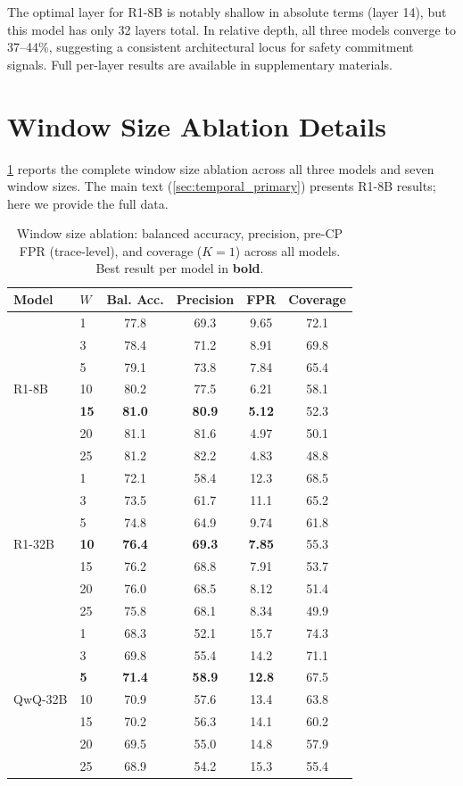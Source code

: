 The optimal layer for R1-8B is notably shallow in absolute terms (layer 14), but this model has only 32 layers total. In relative depth, all three models converge to 37--44\%, suggesting a consistent architectural locus for safety commitment signals. Full per-layer results are available in supplementary materials.


\section{Window Size Ablation Details}
\label{app:window_ablation}

\cref{tab:window_full} reports the complete window size ablation across all three models and seven window sizes. The main text (\cref{sec:temporal_primary}) presents R1-8B results; here we provide the full data.

\begin{table}[h]
\centering
\small
\caption{Window size ablation: balanced accuracy, precision, pre-CP FPR (trace-level), and coverage ($K{=}1$) across all models. Best result per model in \textbf{bold}.}
\label{tab:window_full}
\begin{tabular}{llcccc}
\toprule
Model & $W$ & Bal. Acc. & Precision & FPR & Coverage \\
\midrule
\multirow{7}{*}{R1-8B}
 & 1  & 77.8 & 69.3 & 9.65 & 72.1 \\
 & 3  & 78.4 & 71.2 & 8.91 & 69.8 \\
 & 5  & 79.1 & 73.8 & 7.84 & 65.4 \\
 & 10 & 80.2 & 77.5 & 6.21 & 58.1 \\
 & \textbf{15} & \textbf{81.0} & \textbf{80.9} & \textbf{5.12} & 52.3 \\
 & 20 & 81.1 & 81.6 & 4.97 & 50.1 \\
 & 25 & 81.2 & 82.2 & 4.83 & 48.8 \\
\midrule
\multirow{7}{*}{R1-32B}
 & 1  & 72.1 & 58.4 & 12.3 & 68.5 \\
 & 3  & 73.5 & 61.7 & 11.1 & 65.2 \\
 & 5  & 74.8 & 64.9 & 9.74 & 61.8 \\
 & \textbf{10} & \textbf{76.4} & \textbf{69.3} & \textbf{7.85} & 55.3 \\
 & 15 & 76.2 & 68.8 & 7.91 & 53.7 \\
 & 20 & 76.0 & 68.5 & 8.12 & 51.4 \\
 & 25 & 75.8 & 68.1 & 8.34 & 49.9 \\
\midrule
\multirow{7}{*}{QwQ-32B}
 & 1  & 68.3 & 52.1 & 15.7 & 74.3 \\
 & 3  & 69.8 & 55.4 & 14.2 & 71.1 \\
 & \textbf{5}  & \textbf{71.4} & \textbf{58.9} & \textbf{12.8} & 67.5 \\
 & 10 & 70.9 & 57.6 & 13.4 & 63.8 \\
 & 15 & 70.2 & 56.3 & 14.1 & 60.2 \\
 & 20 & 69.5 & 55.0 & 14.8 & 57.9 \\
 & 25 & 68.9 & 54.2 & 15.3 & 55.4 \\
\bottomrule
\end{tabular}
\end{table}


